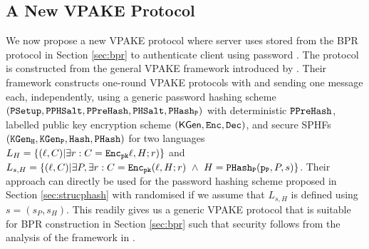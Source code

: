 \subsection{A New VPAKE Protocol} \label{sec:vpake}
We now propose a new \ac{VPAKE} protocol where server \Server uses \ver stored from the \ac{BPR} protocol in Section \ref{sec:bpr} to authenticate client \Client using password \pwd. 
The protocol is constructed from the general \ac{VPAKE} framework introduced by \citet{BenhamoudaP13}. 
Their framework constructs one-round \ac{VPAKE} protocols with \Client and \Server sending one message each, independently, using a generic password hashing scheme $(\mathtt{PSetup}, \mathtt{PPHSalt}, \mathtt{PPreHash},\mathtt{PHSalt}, \mathtt{PHash_P})$ with deterministic $\mathtt{PPreHash}$, labelled public key encryption scheme $(\mathsf{KGen}, \mathtt{Enc}, \mathtt{Dec})$, and secure \acp{SPHF} $(\mathtt{KGen_H}, \mathtt{KGen_P}, \mathtt{Hash}, \mathtt{PHash})$ for two languages $L_H = \{(\ell, C) | \exists r : C = \mathtt{Enc}_\mathtt{pk}\ell, H; r)\}$ and $L_{s,H}  = \{(\ell, C) | \exists P, \exists r : C = \mathtt{Enc}_\mathtt{pk}(\ell, H; r)\ \wedge\ H = \mathtt{PHash_P}(\mathtt{p_P},\allowbreak P, s)\}$. 
Their approach can directly be used for the password hashing scheme proposed in Section \ref{sec:strucphash} with randomised \PPreHash if we assume that $L_{s,H}$ is defined using $s=(s_P,s_H)$. 
This readily gives us a generic \ac{VPAKE} protocol that is suitable for \ac{BPR} construction in Section \ref{sec:bpr} such that security follows from the analysis of the framework in \cite{BenhamoudaP13}.

